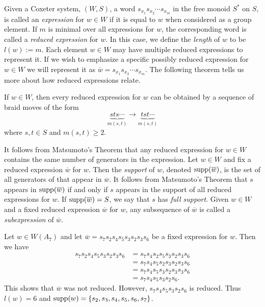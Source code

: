 Given a Coxeter system, $(W,S)$, a word $s_{x_1}s_{x_2} \cdots s_{x_m}$ in the free monoid $S^*$ on $S$, is called an \emph{expression} for $w \in W$ if it is equal to $w$ when considered as a group element. If $m$ is minimal over all expressions for $w$, the corresponding word is called a \emph{reduced expression} for $w$. In this case, we define the \emph{length} of $w$ to be $l(w):= m$. Each element $w \in W$ may have multiple reduced expressions to represent it. If we wish to emphasize a specific possibly reduced expression for $w \in W$ we will represent it as $\overline{w}=s_{x_1}s_{x_2}\cdots s_{x_m}.$ The following theorem tells us more about how reduced expressions relate.

\begin{theorem} 
	If $w \in W$, then every reduced expression for $w$ can be obtained by a sequence of braid moves of the form
	\[\underbrace{sts\cdots}_{m(s,t)} \rightarrow \underbrace{tst\cdots}_{m(s,t)}\]
	where $s,t \in S$ and $m(s,t) \geq 2$.
\end{theorem}
 
It follows from Matsumoto's Theorem that any reduced expression for $w \in W$ contains the same number of generators in the expression. Let $w \in W$ and fix a reduced expression $\overline{w}$ for $w$. Then the \emph{support} of $w$, denoted $\mathrm{supp}(\overline{w})$, is the set of all generators of that appear in $\overline{w}$. It follows from Matsumoto's Theorem that $s$ appears in $\mathrm{supp}(\overline{w})$ if and only if $s$ appears in the support of all reduced expressions for $w$. If $\mathrm{supp}(\overline{w})=S$, we say that $s$ has \emph{full support}. Given $w \in W$ and a fixed reduced expression $\overline{w}$ for $w$, any subsequence of $\overline{w}$ is called a \emph{subexpression} of $\overline{w}$. \\

\begin{example}
Let $w \in W(A_7)$ and let $\overline{w}=s_7s_2s_4s_5s_3s_2s_3s_6$ be a fixed expression for $w$. Then we have
\begin{align*}
s_7s_2s_4s_5s_3s_2s_3s_6&=s_7s_4s_2s_5s_3s_2s_3s_6\\
&=s_7s_4s_5s_2s_3s_2 s_3s_6\\
&=s_7s_4s_5s_3s_2s_3s_3s_6\\
&=s_7s_4s_5s_3s_2s_6.
\end{align*}
This shows that $\overline{w}$ was not reduced. However, $s_7s_4s_5s_3s_2s_6$ is reduced. Thus $l(w)=6$ and $\mathrm{supp}(w)=\{s_2, s_3, s_4, s_5, s_6, s_7\}$.
\end{example}

